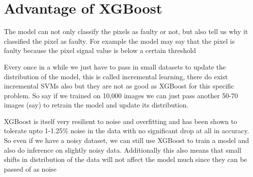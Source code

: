 \documentclass[12pt]{article}
\numberwithin{equation}{section}
\begin{document}
\section{Advantage of XGBoost}
The model can not only classify the pixels as faulty or not, but also tell us why it classified the pixel as faulty. For example the model may say that the pixel is faulty because the pixel signal value is below a certain threshold

Every once in a while we just have to pass in small datasets to update the distribution of the model, this is called incremental learning, there do exist incremental SVMs also but they are not as good as XGBoost for this specific problem. So say if we trained on 10,000 images we can just pass another 50-70 images (say) to retrain the model and update its distribution.

XGBoost is itself very resilient to noise and overfitting and has been shown to tolerate upto 1-1.25\% noise in the data with no significant drop at all in accuracy. So even if we have a noisy dataset, we can still use XGBoost to train a model and also do inference on slightly noisy data. Additionally this also means that small shifts in distribution of the data will not affect the model much since they can be passed of as noise

\end{document}
